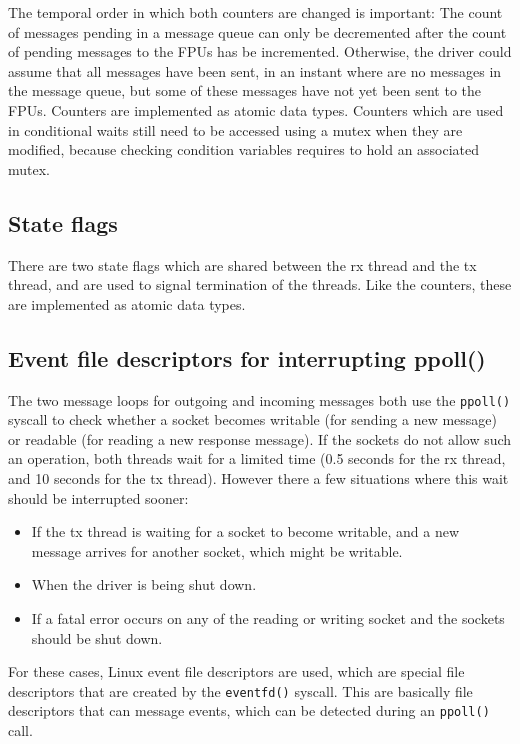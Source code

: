 \documentclass[fontsize=12,a4paper]{scrartcl}
\begin{document}
The temporal order in which both counters are changed is important:
The count of messages pending in a message queue can only be
decremented after the count of pending messages to the FPUs has be
incremented. Otherwise, the driver could assume that all messages have
been sent, in an instant where are no messages in the message queue,
but some of these messages have not yet been sent to the FPUs.
Counters are implemented as atomic data types. Counters which are used
in conditional waits still need to be accessed using a mutex when they
are modified, because checking condition variables requires to hold an
associated mutex.



\subsection{State flags}

There are two state flags which are shared between the rx thread and
the tx thread, and are used to signal termination of the threads. Like
the counters, these are implemented as atomic data types.

\subsection{Event file descriptors for interrupting ppoll()}

The two message loops for outgoing and incoming messages both use the
\texttt{ppoll()} syscall to check whether a socket becomes writable
(for sending a new message) or readable (for reading a new response
message). If the sockets do not allow such an operation, both threads
wait for a limited time (0.5 seconds for the rx thread, and 10 seconds
for the tx thread). However there a few situations where this wait
should be interrupted sooner:

\begin{itemize}
\item If the tx thread is waiting for a socket to become
  writable, and a new message arrives for another socket,
  which might be writable.
\item When the driver is being shut down.
\item If a fatal error occurs on any of the reading or writing socket
  and the sockets should be shut down.
\end{itemize}

For these cases, Linux event file descriptors are used, which are
special file descriptors that are created by the \texttt{eventfd()}
syscall.  This are basically file descriptors that can message events,
which can be detected during an \texttt{ppoll()} call.
\end{document}
